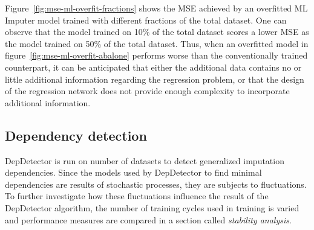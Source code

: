 Figure~\ref{fig:mse-ml-overfit-fractions} shows the MSE achieved by an overfitted ML Imputer model trained with different fractions of the total dataset.
One can observe that the model trained on 10\% of the total dataset scores a lower MSE as the model trained on 50\% of the total dataset.
Thus, when an overfitted model in figure~\ref{fig:mse-ml-overfit-abalone} performs worse than the conventionally trained counterpart, it can be anticipated that either the additional data contains no or little additional information regarding the regression problem, or that the design of the regression network does not provide enough complexity to incorporate additional information.


\subsection{Dependency detection}
DepDetector is run on number of datasets to detect generalized imputation dependencies.
Since the models used by DepDetector to find minimal dependencies are results of stochastic processes, they are subjects to fluctuations.
To further investigate how these fluctuations influence the result of the DepDetector algorithm, the number of training cycles used in training is varied and performance measures are compared in a section called \emph{stability analysis}.

